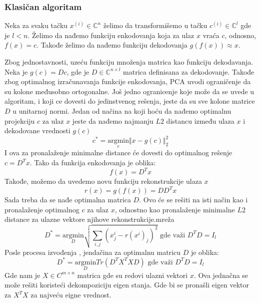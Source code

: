 \documentclass[12pt, letterpaper, oneside]{article}
\begin{document}
\subsubsection{Klasičan algoritam}
Neka za svaku tačku $x^{(i)} \in \mathbb{C}^n$ želimo da transformišemo u tačku $c^{(i)} \in \mathbb{C}^l$ gde je $l < n$.
Želimo da nađemo funkciju enkodovanja koja za ulaz $x$ vraća $c$, odnosno, $f(x)=c$. Takođe želimo da nađemo funkciju dekodovanja $g(f(x)) \approx x$.

Zbog jednostavnosti, uzeću funkciju množenja matrica kao funkciju dekodavanja. Neka je $g(c)=Dc$, gde je
$D \in \mathbb{C}^{n \times l}$ matrica definisana za dekodovanje. Takođe zbog optimalnog izračunavanja funkcije enkodovanja, 
PCA uvodi ograničenje da su kolone međusobno ortogonalne. Još jedno ogranicenje koje može da se uvede u algoritam,
i koji ce dovesti do jedinstvenog rešenja, jeste da su sve kolone matrice $D$ u unitarnoj normi.
Jedan od načina na koji hoću da nađemo optimalnu projekciju $c$ za ulaz $x$ jeste da nađemo najmanju $L2$ distancu između
ulaza $x$ i dekodovane vrednosti $g(c)$
\[
  c^{*} = \underset{c}{\mathrm{argmin}} \Vert x-g(c) \Vert_2^2
\]
I ova za pronalaženje minimalne distance će dovesti do optimalnog rešenje $c=D^{T}x$\cite{goodfellow2016deep}. Tako da funkcija enkodovanja je oblika:
\[
f(x) = D^Tx
\]
Takođe, možemo da uvedemo novu funkciju rekonstrukcije ulaza $x$
\[
  r(x) = g(f(x)) = DD^Tx  
\]
Sada treba da se nađe optimalna matrica $D$. Ovo će se rešiti na isti način kao i pronalaženje optimalnog $c$ za ulaz $x$, odnostno kao pronalaženje minimalne $L2$ distance za ulazne vektore
njihove rekonstrukcije.mreža
\[
    D^{*} =\underset{D}{\mathrm{argmin}} \sqrt{\sum_{i,j}(x^i_j - r(x^i)_j)^2} \text{ gde važi } D^TD = I_l
\]
Posle procesa izvođenja \cite{goodfellow2016deep}, jendačina za optimalnu matricu $D$ je oblika:
\[
    D^{*} =\underset{D}{\mathrm{argmin}}  Tr(D^TX^TXD) \text{ gde važi } D^TD = I_l
\] 
Gde nam je $X \in C^{m \times n}$ matrica gde su redovi ulazni vektori $x$. Ova jednačna se može rešiti koristeći dekompoziciju eigen stanja.
Gde bi se pronašli eigen vektor za $X^TX$ za najveću eigne vrednost. 
\end{document}
